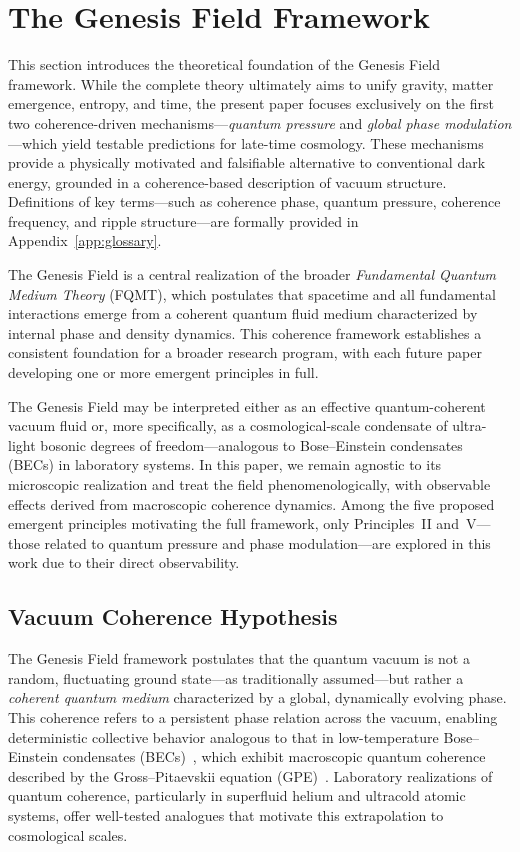 \section{The Genesis Field Framework}
\label{sec:field_framework}

This section introduces the theoretical foundation of the Genesis Field framework. While the complete theory ultimately aims to unify gravity, matter emergence, entropy, and time, the present paper focuses exclusively on the first two coherence-driven mechanisms—\emph{quantum pressure} and \emph{global phase modulation}—which yield testable predictions for late-time cosmology. These mechanisms provide a physically motivated and falsifiable alternative to conventional dark energy, grounded in a coherence-based description of vacuum structure. Definitions of key terms—such as coherence phase, quantum pressure, coherence frequency, and ripple structure—are formally provided in Appendix~\ref{app:glossary}.

The Genesis Field is a central realization of the broader \emph{Fundamental Quantum Medium Theory} (FQMT), which postulates that spacetime and all fundamental interactions emerge from a coherent quantum fluid medium characterized by internal phase and density dynamics. This coherence framework establishes a consistent foundation for a broader research program, with each future paper developing one or more emergent principles in full.

The Genesis Field may be interpreted either as an effective quantum-coherent vacuum fluid or, more specifically, as a cosmological-scale condensate of ultra-light bosonic degrees of freedom—analogous to Bose–Einstein condensates (BECs) in laboratory systems. In this paper, we remain agnostic to its microscopic realization and treat the field phenomenologically, with observable effects derived from macroscopic coherence dynamics. Among the five proposed emergent principles motivating the full framework, only Principles~II and~V—those related to quantum pressure and phase modulation—are explored in this work due to their direct observability.

\subsection{Vacuum Coherence Hypothesis}
\label{sec:principle1}

The Genesis Field framework postulates that the quantum vacuum is not a random, fluctuating ground state—as traditionally assumed—but rather a \emph{coherent quantum medium} characterized by a global, dynamically evolving phase. This coherence refers to a persistent phase relation across the vacuum, enabling deterministic collective behavior analogous to that in low-temperature Bose–Einstein condensates (BECs)~\cite{Bose1924,Einstein1925}, which exhibit macroscopic quantum coherence described by the Gross–Pitaevskii equation (GPE)~\cite{Gross1961,Pitaevskii1961}. Laboratory realizations of quantum coherence, particularly in superfluid helium and ultracold atomic systems, offer well-tested analogues that motivate this extrapolation to cosmological scales.

